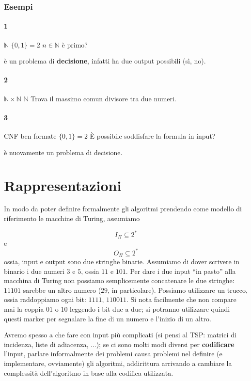 \subsubsection{Esempi}
\paragraph{1}
 {$\mathbb{N}$} {$\{0, 1\} = 2$} {$n \in \mathbb{N}$ è primo?}

è un problema di \textbf{decisione}, infatti ha due output possibili (sì, no).

\paragraph{2}
 {$\mathbb{N}\times\mathbb{N}$} {$\mathbb{N}$}
{Trova il massimo comun divisore tra due numeri.}

\paragraph{3}
 {CNF ben formate} {$\{0, 1\} = 2$} {\`E possibile soddisfare la formula in input?}

è nuovamente un problema di decisione.

\section{Rappresentazioni}
In modo da poter definire formalmente gli algoritmi prendendo come modello
di riferimento le macchine di Turing, assumiamo

$$
	I_{\Pi} \subseteq 2^*
$$
e
$$
	O_{\Pi} \subseteq 2^*
$$
ossia, input e output sono due stringhe binarie.
Assumiamo di dover scrivere in binario i due numeri $3$ e $5$, ossia $11$ e $101$.
Per dare i due input ``in pasto'' alla macchina di Turing non possiamo
semplicemente concatenare le due stringhe: $11101$ sarebbe un altro numero
($29$, in particolare). Possiamo utilizzare un trucco, ossia raddoppiamo ogni
bit: $1111$, $110011$. Si nota facilmente che non compare mai la coppia $01$ o
$10$ leggendo i bit due a due; si potranno utilizzare quindi questi marker per
segnalare la fine di un numero e l'inizio di un altro.

Avremo spesso a che fare con input più complicati
(si pensi al \textsc{TSP}: matrici di incidenza, liste di adiacenza, ...);
se ci sono molti modi diversi per \textbf{codificare} l'input, parlare informalmente
dei problemi causa problemi nel definire (e implementare, ovviamente)
gli algoritmi, addirittura arrivando a cambiare la complessità dell'algoritmo
in base alla codifica utilizzata.

